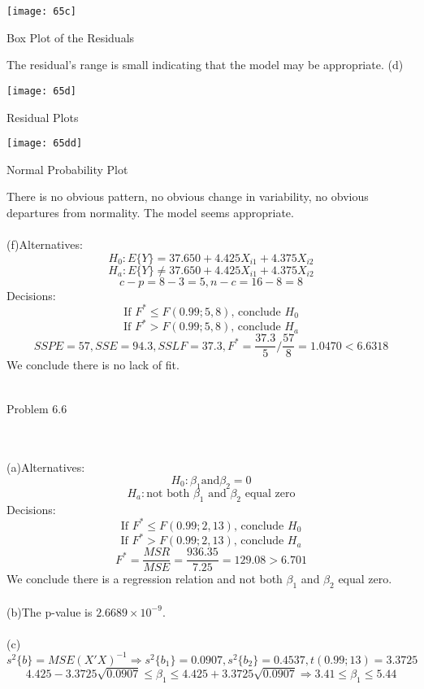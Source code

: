 \documentclass{article}
\begin{document}
\begin{center}\texttt{[image: 65c]}
   \begin{center}Box Plot of the Residuals\end{center}\end{center}
   The residual's range is small indicating that the model may be appropriate.
   \newpage(d)\begin{center}\texttt{[image: 65d]}
   \begin{center}Residual Plots\end{center}\end{center}
   \begin{center}\texttt{[image: 65dd]}
   \begin{center}Normal Probability Plot\end{center}\end{center}
   There is no obvious pattern, no obvious change in variability, no obvious departures from normality. The model seems appropriate.
   \\\\(f)Alternatives:\[H_0:E\{Y\}=37.650+4.425X_{i1}+4.375X_{i2}\]
   \[H_a:E\{Y\}\neq37.650+4.425X_{i1}+4.375X_{i2}\]
   \[c-p=8-3=5,n-c=16-8=8\]
   Decisions:\[\text{If $F^*\leq F(0.99;5,8)$, conclude $H_0$}\]
   \[\text{If $F^*>F(0.99;5,8)$, conclude $H_a$}\]
   \[SSPE=57,SSE=94.3,SSLF=37.3,F^*=\frac{37.3}{5}/\frac{57}{8}=1.0470<	 6.6318\]
   We conclude there is no lack of fit.
\\\\\begin{large}Problem 6.6\end{large}
\\\\(a)Alternatives:\[H_0:\beta_1 \text{and} \beta_2=0\]
\[H_a:\text{not both $\beta_1$ and $\beta_2$ equal zero}\]
Decisions:\[\text{If $F^*\leq F(0.99;2,13)$, conclude $H_0$}\]
   \[\text{If $F^*>F(0.99;2,13)$, conclude $H_a$}\]
   \[F^*=\frac{MSR}{MSE}=\frac{936.35}{7.25}=129.08>6.701\]
   We conclude there is a regression relation and not both $\beta_1$ and $\beta_2$ equal zero.
  \\\\ (b)The p-value is $2.6689 \times 10^{-9}$.
  \\\\(c)\[s^2\{b\}=MSE(X'X)^{-1}\Rightarrow s^2\{b_1\}=0.0907,s^2\{b_2\}=0.4537,t(0.99;13)=3.3725\]
  \[4.425-3.3725\sqrt{0.0907}\leq\beta_1\leq4.425+3.3725\sqrt{0.0907}\Rightarrow 3.41\leq\beta_1\leq5.44\]
\end{document}
